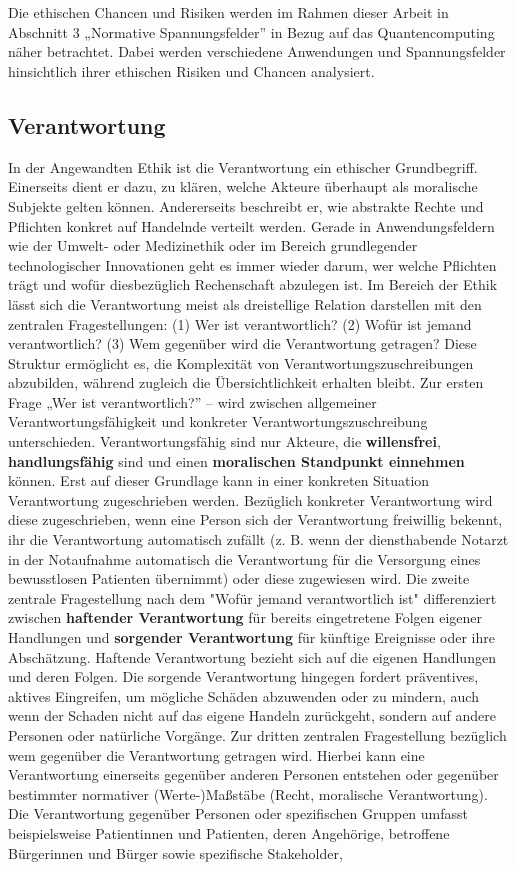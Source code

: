 \\
\\
Die ethischen Chancen und Risiken werden im Rahmen dieser Arbeit in Abschnitt 3 „Normative Spannungsfelder” in Bezug auf das Quantencomputing näher betrachtet. Dabei werden verschiedene Anwendungen und Spannungsfelder hinsichtlich ihrer ethischen Risiken und Chancen analysiert.


\subsection{Verantwortung}
In der Angewandten Ethik ist die Verantwortung ein ethischer Grundbegriff. Einerseits dient er dazu, zu klären, welche Akteure überhaupt als moralische Subjekte gelten können. Andererseits beschreibt er, wie abstrakte Rechte und Pflichten konkret auf Handelnde verteilt werden. Gerade in Anwendungsfeldern wie der Umwelt- oder Medizinethik oder im Bereich grundlegender technologischer Innovationen geht es immer wieder darum, wer welche Pflichten trägt und wofür diesbezüglich Rechenschaft abzulegen ist. Im Bereich der Ethik lässt sich die Verantwortung meist als dreistellige Relation darstellen mit den zentralen Fragestellungen: (1) Wer ist verantwortlich? (2) Wofür ist jemand verantwortlich? (3) Wem gegenüber wird die Verantwortung getragen? Diese Struktur ermöglicht es, die Komplexität von Verantwortungszuschreibungen abzubilden, während zugleich die Übersichtlichkeit erhalten bleibt. Zur ersten Frage „Wer ist verantwortlich?” – wird zwischen allgemeiner Verantwortungsfähigkeit und konkreter Verantwortungszuschreibung unterschieden. Verantwortungsfähig sind nur Akteure, die \textbf{willensfrei}, \textbf{handlungsfähig} sind und einen \textbf{moralischen Standpunkt einnehmen} können. Erst auf dieser Grundlage kann in einer konkreten Situation Verantwortung zugeschrieben werden. Bezüglich konkreter Verantwortung wird diese zugeschrieben, wenn eine Person sich der Verantwortung freiwillig bekennt, ihr die Verantwortung automatisch zufällt (z. B. wenn der diensthabende Notarzt in der Notaufnahme automatisch die Verantwortung für die Versorgung eines bewusstlosen Patienten übernimmt) oder diese zugewiesen wird. Die zweite zentrale Fragestellung nach dem "Wofür jemand verantwortlich ist" differenziert zwischen \textbf{haftender Verantwortung} für bereits eingetretene Folgen eigener Handlungen und \textbf{sorgender Verantwortung} für künftige Ereignisse oder ihre Abschätzung. Haftende Verantwortung bezieht sich auf die eigenen Handlungen und deren Folgen. Die sorgende Verantwortung hingegen fordert präventives, aktives Eingreifen, um mögliche Schäden abzuwenden oder zu mindern, auch wenn der Schaden nicht auf das eigene Handeln zurückgeht, sondern auf andere Personen oder natürliche Vorgänge. Zur dritten zentralen Fragestellung bezüglich wem gegenüber die Verantwortung getragen wird. Hierbei kann eine Verantwortung einerseits gegenüber anderen Personen entstehen oder gegenüber bestimmter normativer (Werte-)Maßstäbe (Recht, moralische Verantwortung). Die Verantwortung gegenüber Personen oder spezifischen Gruppen umfasst beispielsweise Patientinnen und Patienten, deren Angehörige, betroffene Bürgerinnen und Bürger sowie spezifische Stakeholder, 